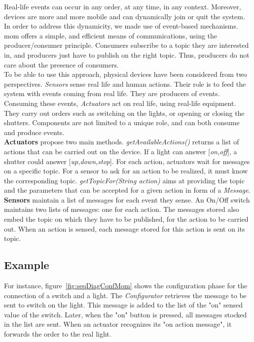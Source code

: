 Real-life events can occur in any order, at any time, in any context. Moreover, devices are more and more mobile and can dynamically join or quit the system. In order to address this dynamicity, we made use of event-based mechanisms. \gls{mom} offers a simple, and efficient means of communications, using the producer/consumer principle. Consumers subscribe to a topic they are interested in, and producers just have to publish on the right topic. Thus, producers do not care about the presence of consumers.\\
To be able to use this approach, physical devices have been considered from two perspectives. {\it Sensors} sense real life and human actions. Their role is to feed the system with events coming from real life. They are producers of events. Consuming these events, {\it Actuators} act on real life, using real-life equipment. They carry out orders such as switching on the lights, or opening or closing the shutters. 
Components are not limited to a unique role, and can both consume and produce events.\\

{\bf Actuators} propose two main methods. {\it getAvailableActions()} returns a list of actions that can be carried out on the device. If a light can answer [{\it on,off}], a shutter could answer [{\it up,down,stop}]. For each action, actuators wait for messages on a specific topic. For a sensor to ask for an action to be realized, it must know the corresponding topic. {\it getTopicFor(String action)} aims at providing the topic and the parameters that can be accepted for a given action in form of a {\it Message}.\\

{\bf Sensors} maintain a list of messages for each event they sense. An On/Off switch maintains two lists of messages: one for each action. The messages stored also embed the topic on which they have to be published, for the action to be carried out. When an action is sensed, each message stored for this action is sent on its topic.


\subsection{Example}

For instance, figure~\ref{fig:seqDiagConfMom} shows the configuration phase for the connection of a switch and a light. The \textit{Configurator} retrieves the message to be sent to switch on the light. This message is added to the list of the "on" sensed value of the switch. Later, when the "on" button is pressed, all messages stocked in the list are sent. When an actuator recognizes its "on action message", it forwards the order to the real light.\\

